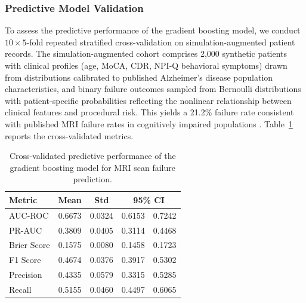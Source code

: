 \documentclass[11pt,a4paper]{article}
\begin{document}
\subsubsection{Predictive Model Validation}

To assess the predictive performance of the gradient boosting model, we conduct $10 \times 5$-fold repeated stratified cross-validation on simulation-augmented patient records. The simulation-augmented cohort comprises 2,000 synthetic patients with clinical profiles (age, MoCA, CDR, NPI-Q behavioral symptoms) drawn from distributions calibrated to published Alzheimer's disease population characteristics, and binary failure outcomes sampled from Bernoulli distributions with patient-specific probabilities reflecting the nonlinear relationship between clinical features and procedural risk. This yields a 21.2\% failure rate consistent with published MRI failure rates in cognitively impaired populations \citep{porembka2025disparities}. Table~\ref{tab:ml_cv_metrics} reports the cross-validated metrics.

\begin{table}[H]
\centering
\caption{Cross-validated predictive performance of the gradient boosting model for MRI scan failure prediction.}
\label{tab:ml_cv_metrics}
\begin{tabular}{lcccc}
\toprule
Metric & Mean & Std & \multicolumn{2}{c}{95\% CI} \\
\midrule
AUC-ROC & 0.6673 & 0.0324 & 0.6153 & 0.7242 \\
PR-AUC & 0.3809 & 0.0405 & 0.3114 & 0.4468 \\
Brier Score & 0.1575 & 0.0080 & 0.1458 & 0.1723 \\
F1 Score & 0.4674 & 0.0376 & 0.3917 & 0.5302 \\
Precision & 0.4335 & 0.0579 & 0.3315 & 0.5285 \\
Recall & 0.5155 & 0.0460 & 0.4497 & 0.6065 \\
\bottomrule
\end{tabular}
\end{table}
\end{document}
